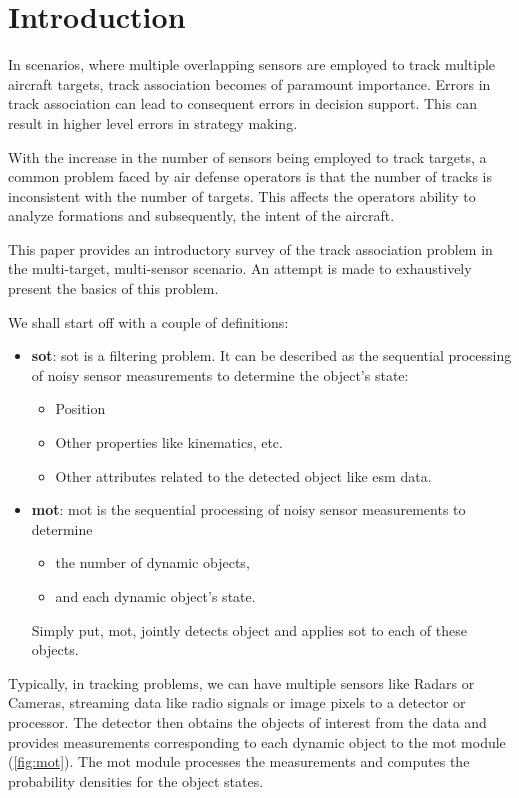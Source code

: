 \documentclass[a4paper]{article}
\begin{document}
\section{Introduction}
In scenarios, where multiple overlapping sensors are employed to track multiple aircraft targets, track association becomes of paramount importance. Errors in track association can lead to consequent errors in decision support. This can result in higher level errors in strategy making.\par
With the increase in the number of sensors being employed to track targets, a common problem faced by air defense operators is that the number of tracks is inconsistent with the number of targets. This affects the operators ability to analyze formations and subsequently, the intent of the aircraft.\par
This paper provides an introductory survey of the track association problem in the multi-target, multi-sensor scenario. An attempt is made to exhaustively present the basics of this problem.\par
We shall start off with a couple of definitions:
\begin{itemize}
	\item \textbf{\acrfull{sot}}: \gls{sot} is a filtering problem. It can be described as the sequential processing of noisy sensor measurements to determine the object's state:
	\begin{itemize}
		\item Position
		\item Other properties like kinematics, etc.
		\item Other attributes related to the detected object like \gls{esm} data.
	\end{itemize}
	\item \textbf{\acrfull{mot}}: \gls{mot} is the sequential processing of noisy sensor measurements to determine
	\begin{itemize}
		\item the number of dynamic objects,
		\item and each dynamic object's state.
	\end{itemize}
	Simply put, \gls{mot}, jointly detects object and applies \gls{sot} to each of these objects.
\end{itemize}%
Typically, in tracking problems, we can have multiple sensors like Radars or Cameras, streaming data like radio signals or image pixels to a detector or processor. The detector then obtains the objects of interest from the data and provides measurements corresponding to each dynamic object to the \gls{mot} module (\cref{fig:mot}). The \gls{mot} module processes the measurements and computes the probability densities for the object states.\par%
\end{document}
